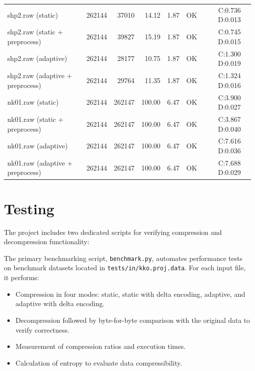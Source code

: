 \documentclass[a4paper,12pt]{article}
\begin{document}
{\begin{tabular}{lrrrrrrr}
            shp2.raw (static)                  & 262144      & 37010         & 14.12     & 1.87    & OK  & C:0.736 D:0.013 \\
            shp2.raw (static + preprocess)     & 262144      & 39827         & 15.19     & 1.87    & OK  & C:0.745 D:0.015 \\
            shp2.raw (adaptive)                & 262144      & 28177         & 10.75     & 1.87    & OK  & C:1.300 D:0.019 \\
            shp2.raw (adaptive + preprocess)   & 262144      & 29764         & 11.35     & 1.87    & OK  & C:1.324 D:0.016 \\
            nk01.raw (static)                  & 262144      & 262147        & 100.00    & 6.47    & OK  & C:3.900 D:0.027 \\
            nk01.raw (static + preprocess)     & 262144      & 262147        & 100.00    & 6.47    & OK  & C:3.867 D:0.040 \\
            nk01.raw (adaptive)                & 262144      & 262147        & 100.00    & 6.47    & OK  & C:7.616 D:0.036 \\
            nk01.raw (adaptive + preprocess)   & 262144      & 262147        & 100.00    & 6.47    & OK  & C:7.688 D:0.029 \\
            \hline
        \end{tabular}
    }




    \section{Testing}

    The project includes two dedicated scripts for verifying compression and decompression functionality:

    The primary benchmarking script, \texttt{benchmark.py}, automates performance tests on benchmark datasets located in \texttt{tests/in/kko.proj.data}. For each input file, it performs:

    \begin{itemize}
        \item Compression in four modes: static, static with delta encoding, adaptive, and adaptive with delta encoding.
        \item Decompression followed by byte-for-byte comparison with the original data to verify correctness.
        \item Measurement of compression ratios and execution times.
        \item Calculation of entropy to evaluate data compressibility.
    \end{itemize}
\end{document}
